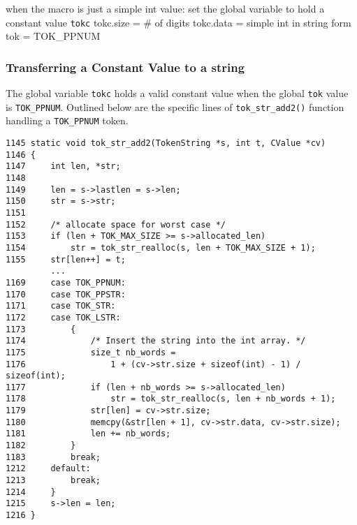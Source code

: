 when the macro is just a simple int value:
        set the global variable to hold a constant value \verb|tokc|
        tokc.size = \# of digits
        tokc.data = simple int in string form
        tok = TOK\_PPNUM


\subsubsection{Transferring a Constant Value to a string}

The global variable \verb|tokc| holds a valid constant value when the global \verb|tok| value is \verb|TOK_PPNUM|. Outlined below are the specific lines of \verb|tok_str_add2()| function handling a \verb|TOK_PPNUM| token.

\begin{verbatim}
1145 static void tok_str_add2(TokenString *s, int t, CValue *cv)
1146 {
1147     int len, *str;
1148 
1149     len = s->lastlen = s->len;
1150     str = s->str;
1151 
1152     /* allocate space for worst case */
1153     if (len + TOK_MAX_SIZE >= s->allocated_len)
1154         str = tok_str_realloc(s, len + TOK_MAX_SIZE + 1);
1155     str[len++] = t;
         ...
1169     case TOK_PPNUM:
1170     case TOK_PPSTR:
1171     case TOK_STR:
1172     case TOK_LSTR:
1173         {
1174             /* Insert the string into the int array. */
1175             size_t nb_words =
1176                 1 + (cv->str.size + sizeof(int) - 1) / sizeof(int);
1177             if (len + nb_words >= s->allocated_len)
1178                 str = tok_str_realloc(s, len + nb_words + 1);
1179             str[len] = cv->str.size;
1180             memcpy(&str[len + 1], cv->str.data, cv->str.size);
1181             len += nb_words;
1182         }
1183         break;
1212     default:
1213         break;
1214     }
1215     s->len = len;
1216 }
\end{verbatim}


